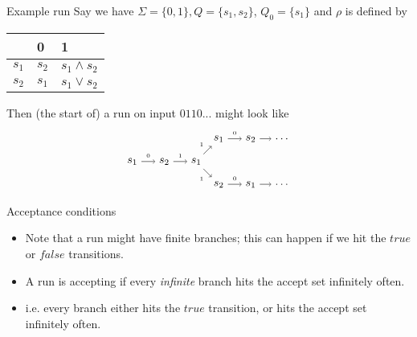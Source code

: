\documentclass{beamer}
\begin{document}
\begin{frame}{Example run}
Say we have $\Sigma = \{0, 1\}, Q = \{s_1, s_2\}$, $Q_0 = \{s_1\}$ and $\rho$ is defined by \\
\begin{center}
\begin{tabular}{| l | l | l |}
\hline & 0 & 1 \\ \hline
$s_1$ & $s_2$ & $s_1 \wedge s_2$ \\ \hline
$s_2$ & $s_1$ & $s_1 \vee s_2$ \\ \hline
\end{tabular}
\end{center}
Then (the start of) a run on input $0110...$ might look like \\
$$
\begin{tikzpicture}[auto]
\node (1) {$s_1$};
\node [right of=1] (2) {$s_2$};
\node [right of=2] (3) {$s_1$};
\node [above right of=3] (4a) {$s_1$};
\node [below right of=3] (4b) {$s_2$};
\node [right of=4a] (5a) {$s_2$};
\node [right of=4b] (5b) {$s_1$};
\node [right of=5a] (d1) {$\dots$};
\node [right of=5b] (d2) {$\dots$};
\path[->] (1) edge node {{\tiny $0$}} (2)
          (2) edge node {{\tiny $1$}} (3)
          (3) edge node {{\tiny $1$}} (4a)
          (3) edge node [below left] {{\tiny $1$}} (4b)
          (4a) edge node {{\tiny $0$}} (5a)
          (4b) edge node {{\tiny $0$}} (5b)
          (5a) edge node {} (d1)
          (5b) edge node {} (d2);
\end{tikzpicture}
$$
\end{frame}

\begin{frame}{Acceptance conditions}
\begin{itemize}
\item Note that a run might have finite branches; this can happen if we hit the $true$ or $false$ transitions.
\item A run is accepting if every \emph{infinite} branch hits the accept set infinitely often.
\item i.e. every branch either hits the $true$ transition, or hits the accept set infinitely often.
\end{itemize}
\end{frame}
\end{document}
